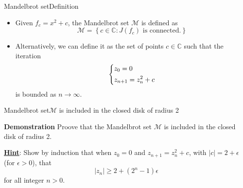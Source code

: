 \documentclass[usenames,dvipsnames,svgnames,10pt,aspectratio=169]{beamer}
\begin{document}
\begin{frame}[t, c]{Mandelbrot set}{Definition}
	\begin{itemize}
		\item Given $f_c = x^2 + c$, the Mandelbrot set $\mathcal{M}$ is defined as
		$$
		\mathcal{M} = \left\{ c \in \mathbb{C} : J(f_c) \text{ is connected.}\right\}
		$$
		\medskip
		\item Alternatively, we can define it as the set of points $c \in \mathbb{C}$ such that the iteration
		\begin{equation}
			\left\{
			\begin{aligned}
				& z_0 = 0 \\
				& z_{n+1} = z_n^2 + c
			\end{aligned}
			\right.
			\notag
		\end{equation}
		is bounded as $n \to \infty$.
	\end{itemize}

	\vspace{1cm}
\end{frame}

\begin{frame}[t, c]{Mandelbrot set}{$\mathcal{M}$ is included in the closed disk of radius 2}
	\begin{block}{\centering \textbf{Demonstration} }
		\centering
		Proove that the Mandelbrot set $\mathcal{M}$ is included in the closed disk of radius 2.
	\end{block}

	\bigskip

	\underline{\textbf{Hint}}: Show by induction that when $z_0 = 0$ and $z_{n+1} = z_n^2 + c$, with $\vert c \vert = 2 + \epsilon$ (for $\epsilon > 0$), that
	$$
	\vert z_n \vert \geq 2 + (2^n - 1) \epsilon
	$$
	for all integer $n>0$.

	\vspace{1cm}
\end{frame}
\end{document}
